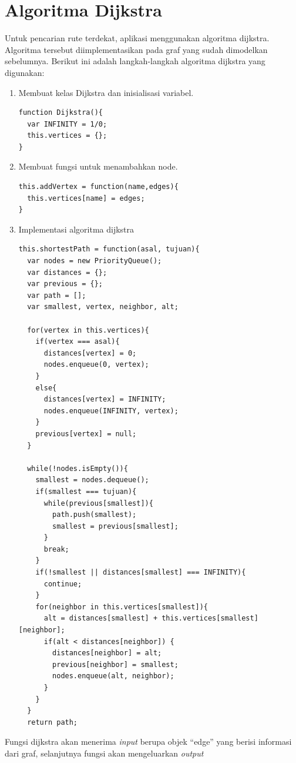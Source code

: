 \section{Algoritma Dijkstra}
Untuk pencarian rute terdekat, aplikasi menggunakan algoritma dijkstra.
Algoritma tersebut diimplementasikan pada graf yang sudah dimodelkan
sebelumnya. Berikut ini adalah langkah-langkah algoritma dijkstra yang
digunakan:
\begin{enumerate}
  \item Membuat kelas Dijkstra dan inisialisasi variabel.
\begin{verbatim}
function Dijkstra(){
  var INFINITY = 1/0;
  this.vertices = {};
}
\end{verbatim}

  \item Membuat fungsi untuk menambahkan node. 
\begin{verbatim}
this.addVertex = function(name,edges){
  this.vertices[name] = edges;
}
\end{verbatim}

  \item Implementasi algoritma dijkstra
\begin{verbatim}
this.shortestPath = function(asal, tujuan){
  var nodes = new PriorityQueue();
  var distances = {};
  var previous = {};
  var path = [];
  var smallest, vertex, neighbor, alt;

  for(vertex in this.vertices){
    if(vertex === asal){
      distances[vertex] = 0;
      nodes.enqueue(0, vertex);
    }
    else{
      distances[vertex] = INFINITY;
      nodes.enqueue(INFINITY, vertex);
    }
    previous[vertex] = null;
  }

  while(!nodes.isEmpty()){
    smallest = nodes.dequeue();
    if(smallest === tujuan){
      while(previous[smallest]){
        path.push(smallest);
        smallest = previous[smallest];
      }
      break;
    }
    if(!smallest || distances[smallest] === INFINITY){
      continue;
    }
    for(neighbor in this.vertices[smallest]){
      alt = distances[smallest] + this.vertices[smallest][neighbor];
      if(alt < distances[neighbor]) {
        distances[neighbor] = alt;
        previous[neighbor] = smallest;
        nodes.enqueue(alt, neighbor);
      }
    }
  }
  return path;
\end{verbatim}
\end{enumerate}
Fungsi dijkstra akan menerima \textit{input} berupa objek ``edge'' yang berisi
informasi dari graf, selanjutnya fungsi akan mengeluarkan \textit{output}
